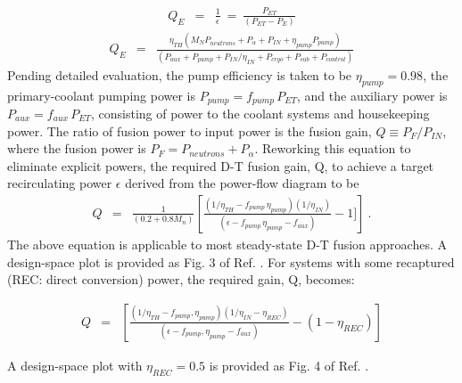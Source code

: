 \begin{eqnarray}
\label{e-2-53}
Q_E & = & \frac{1}{\epsilon} \: = \: \frac{P_{ET}}{(P_{ET} - P_{E})}  
\end{eqnarray}
\begin{eqnarray}
\label{e-2-54}
Q_{E} & = & \frac{\eta_{TH}(M_NP_{neutrons}+P_{\alpha}+P_{IN}+ \eta_{pump}P_{pump})}{(P_{aux} + P_{pump}+P_{IN}/\eta_{IN} + P_{cryo} +P_{sub} + P_{control})} 
 \end{eqnarray}
Pending detailed evaluation, the pump efficiency is taken to be $\eta_{pump} = 0.98$, the primary-coolant pumping power is $P_{pump} = f_{pump} \, P_{ET}$, and the auxiliary power is $P_{aux} = f_{aux} \, P_{ET}$, consisting of power to the coolant systems and housekeeping power.
The ratio of fusion power to input power is the fusion gain, \hbox{$Q \equiv P_{F}/P_{IN}$}, where the fusion power is $P_{F} = P_{neutrons} + P_{\alpha}$. Reworking this equation to eliminate explicit powers, the required D-T fusion gain, Q, to achieve a target recirculating power $\epsilon$ derived from the power-flow diagram to be
\begin{eqnarray}
\label{e-2-54}
Q & = & \frac{1}{(0.2 + 0.8 M_n)}
\left[\frac{(1/\eta_{TH} - f_{pump} \,\eta_{pump})(1/\eta_{IN})}{(\epsilon - f_{pump} \,\eta_{pump} - f_{aux})} - 1]\right] \: .
\end{eqnarray} 
The above equation is applicable to most steady-state D-T fusion approaches.  A design-space plot is provided as Fig. 3 of Ref. \cite{Miller2007}. For systems with some recaptured (REC: direct conversion) power, the required gain, Q, becomes: 



\begin{eqnarray} 
\label{e-2-55} 
Q & = & \left[\frac{(1/\eta_{TH} - f_{pump} , \eta_{pump})(1/\eta_{IN} - \eta_{REC})}{(\epsilon - f_{pump} , \eta_{pump} - f_{aux})} - (1 - \eta_{REC}) \right] 
\end{eqnarray}

A design-space plot with $\eta_{REC} = 0.5$ is provided as Fig. 4 of Ref. \cite{Miller2007}. \\



